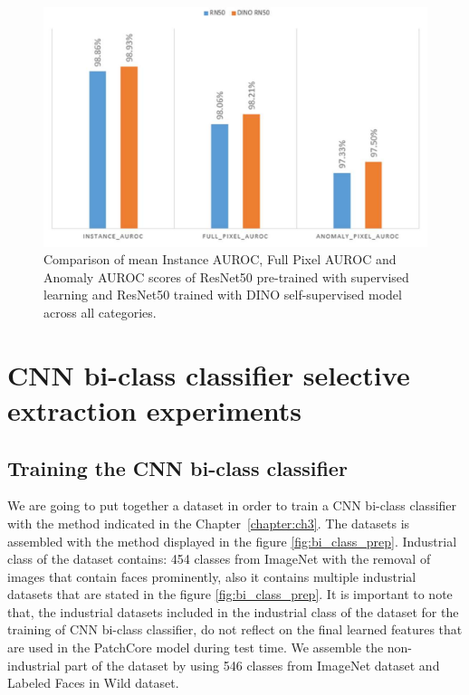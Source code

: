 \begin{figure}[h]
	\begin{center}
		\includegraphics[width=1.0\linewidth]{Chapter_4/dino.png}
	\end{center}
	\caption{Comparison of mean Instance AUROC, Full Pixel AUROC and Anomaly AUROC scores of ResNet50 pre-trained with supervised learning and ResNet50 trained with DINO self-supervised model across all categories.}
	\label{fig:dino_test}
\end{figure}

\section{CNN bi-class classifier selective extraction experiments}
\label{sec:comp_vis}

\subsection{Training the CNN bi-class classifier}
We are going to put together a dataset in order to train a CNN bi-class classifier with the method indicated in the Chapter~\ref{chapter:ch3}. The datasets is assembled with the method displayed in the figure \ref{fig:bi_class_prep}. Industrial class of the dataset contains: 454 classes from ImageNet with the removal of images that contain faces prominently, also it contains multiple industrial datasets that are stated in the figure \ref{fig:bi_class_prep}. It is important to note that, the industrial datasets included in the industrial class of the dataset for the training of CNN bi-class classifier, do not reflect on the final learned features that are used in the PatchCore model during test time. We assemble the non-industrial part of the dataset by using 546 classes from ImageNet dataset and Labeled Faces in Wild dataset.

